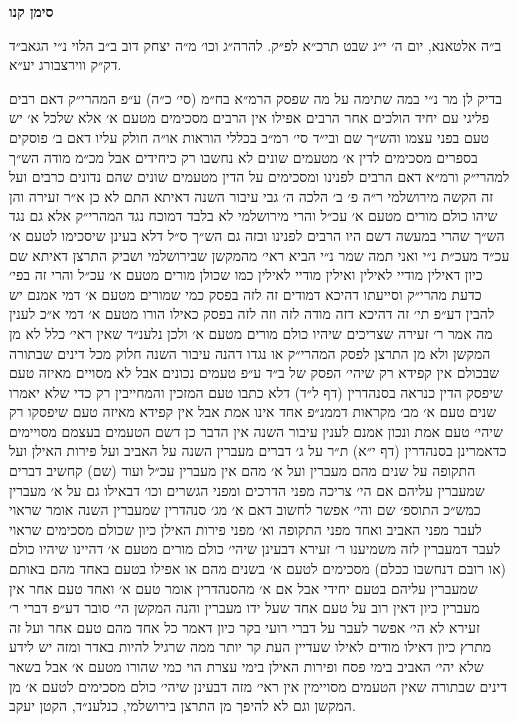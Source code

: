\documentclass[12pt, openany]{book}
\newcommand{\chapname}{}
\newcommand{\newchap}[1]{
	\addcontentsline{toc}{chapter}{#1}
	\renewcommand{\chapname}{#1}
		\begin{center}
			\textbf{%
\fontsize{16pt}{16pt}\selectfont
				#1}
		\end{center}
}
\begin{document}
\newchap{סימן קנו}
\begin{multicols}{2}
ב״ה אלטאנא, יום ה׳ י״ג שבט תרכ״א לפ״ק. להרה״ג וכו׳ מ״ה יצחק דוב ב״ב הלוי נ״י הגאב״ד דק״ק ווירצבורג יע״א.\\\vspace{0pt}

בדיק לן מר נ״י במה שתימה על מה שפסק הרמ״א בח״מ (סי׳ כ״ה) ע״פ המהרי״ק דאם רבים פליגי עם יחיד הולכים אחר הרבים אפילו אין הרבים מסכימים מטעם א׳ אלא שלכל א׳ יש טעם בפני עצמו והש״ך שם ובי״ד סי׳ רמ״ב בכללי הוראות או״ה חולק עליו דאם ב׳ פוסקים בספרים מסכימים לדין א׳ מטעמים שונים לא נחשבו רק כיחידים אבל מכ״מ מודה הש״ך למהרי״ק ורמ״א דאם הרבים לפנינו ומסכימים על הדין מטעמים שונים שהם נדונים כרבים ועל זה הקשה מירושלמי ר״ה פ׳ ב׳ הלכה ה׳ גבי עיבור השנה דאיתא התם לא כן א״ר זעירה והן שיהו כולם מורים מטעם א׳ עכ״ל והרי מירושלמי לא בלבד דמוכח נגד המהרי״ק אלא גם נגד הש״ך שהרי במעשה דשם היו הרבים לפנינו ובזה גם הש״ך ס״ל דלא בעינן שיסכימו לטעם א׳ עכ״ד מעכ״ת נ״י ואני תמה שמר נ״י הביא ראי׳ מהמקשן שבירושלמי ושביק התרצן דאיתא שם כיון דאילין מודיי לאילין ואילין מודיי לאילין כמו שכולן מורים מטעם א׳ עכ״ל והרי זה בפי׳ כדעת מהרי״ק וסייעתו דהיכא דמודים זה לזה בפסק כמי שמורים מטעם א׳ דמי אמנם יש להבין דע״פ תי׳ זה דהיכא דזה מודה לזה וזה לזה בפסק כאילו הורו מטעם א׳ דמי א״כ לענין מה אמר ר׳ זעירה שצריכים שיהיו כולם מורים מטעם א׳ ולכן נלענ״ד שאין ראי׳ כלל לא מן המקשן ולא מן התרצן לפסק המהרי״ק או נגדו דהנה עיבור השנה חלוק מכל דינים שבתורה שבכולם אין קפידא רק שיהי׳ הפסק של ב״ד ע״פ טעמים נכונים אבל לא מסויים מאיזה טעם שיפסק הדין כנראה בסנהדרין (דף ל״ד) דלא כתבו טעם המזכין והמחייבין רק כדי שלא יאמרו שנים טעם א׳ מב׳ מקראות דממנ״פ אחד אינו אמת אבל אין קפידא מאיזה טעם שיפסקו רק שיהי׳ טעם אמת ונכון אמנם לענין עיבור השנה אין הדבר כן דשם הטעמים בעצמם מסויימים כדאמרינן בסנהדרין (דף י״א) ת״ר על ג׳ דברים מעברין השנה על האביב ועל פירות האילן ועל התקופה על שנים מהם מעברין ועל א׳ מהם אין מעברין עכ״ל ועוד (שם) קחשיב דברים שמעברין עליהם אם הי׳ צריכה מפני הדרכים ומפני הגשרים וכו׳ דבאילו גם על א׳ מעברין כמש״כ התוספ׳ שם והי׳ אפשר לחשוב דאם א׳ מג׳ סנהדרין שמעברין השנה אומר שראוי לעבר מפני האביב ואחד מפני התקופה וא׳ מפני פירות האילן כיון שכולם מסכימים שראוי לעבר דמעברין לזה משמיענו ר׳ זעירא דבעינן שיהי׳ כולם מורים מטעם א׳ דהיינו שיהיו כולם (או רובם דנחשבו ככלם) מסכימים לטעם א׳ בשנים מהם או אפילו בטעם באחד מהם באותם שמעברין עליהם בטעם יחידי אבל אם א׳ מהסנהדרין אומר טעם א׳ ואחד טעם אחר אין מעברין כיון דאין רוב על טעם אחד שעל ידו מעברין והנה המקשן הי׳ סובר דע״פ דברי ר׳ זעירא לא הי׳ אפשר לעבר על דברי רועי בקר כיון דאמר כל אחד מהם טעם אחר ועל זה מתרץ כיון דאילו מודים לאילו שעדיין העת קר יותר ממה שרגיל להיות באדר ומזה יש לידע שלא יהי׳ האביב בימי פסח ופירות האילן בימי עצרת הוי כמי שהורו מטעם א׳ אבל בשאר דינים שבתורה שאין הטעמים מסויימין אין ראי׳ מזה דבעינן שיהי׳ כולם מסכימים לטעם א׳ מן המקשן וגם לא להיפך מן התרצן בירושלמי, כנלענ״ד, הקטן יעקב.\\\vspace{0pt}

\end{multicols}\newpage
\end{document}
